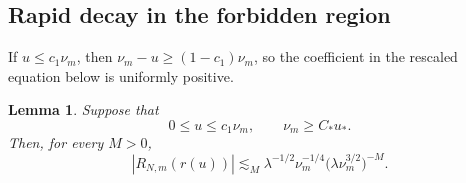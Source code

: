 \documentclass[11pt,a4paper]{amsart}
\newtheorem{lemma}[theorem]{Lemma}
\numberwithin{equation}{section}
\begin{document}
\subsection{Rapid decay in the forbidden region}

If \(u\le c_1\nu_m\), then
\(\nu_m-u\ge(1-c_1)\nu_m\), so the coefficient in the rescaled equation
below is uniformly positive.

\begin{lemma}\label{lem:forbidden-radial}
Suppose that
\[
 0\le u\le c_1\nu_m,
 \qquad \nu_m\ge C_*u_*.
\]
Then, for every \(M>0\),
\begin{equation}\label{eq:forbidden-radial}
 |R_{N,m}(r(u))|
 \lesssim_M
 \lambda^{-1/2}\nu_m^{-1/4}
 \bigl(\lambda\nu_m^{3/2}\bigr)^{-M}.
\end{equation}
\end{lemma}
\end{document}
